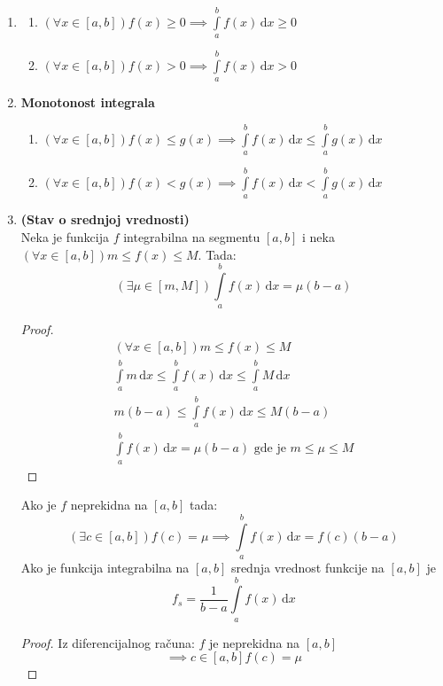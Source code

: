 \begin{enumerate}[label=\textbf{\arabic*.)}]
\begin{proof}
			$$\implies \int \limits^b_a f(x) \, \mathrm{d}x = \int \limits^b_a f_1(x) \, \mathrm{d}x$$
		\end{proof}
	\item
		\begin{theorem}
			\begin{enumerate}[label = \arabic*)]
				\item
					$(\forall x \in [a,b])f(x)\geq 0 \implies \int \limits^b_a f(x) \, \mathrm{d}x \geq 0$
				\item
					$(\forall x \in [a,b])f(x)> 0 \implies \int \limits^b_a f(x) \, \mathrm{d}x > 0$	
			\end{enumerate}
		\end{theorem}
	\item
		\textbf{Monotonost integrala}
		\begin{enumerate}[label = \arabic*)]
				\item
					$(\forall x \in [a,b])f(x)\leq g(x) \implies \int \limits^b_a f(x) \, \mathrm{d}x \leq \int \limits^b_a g(x) \, \mathrm{d}x$
				\item
					$(\forall x \in [a,b])f(x)< g(x) \implies \int \limits^b_a f(x) \, \mathrm{d}x < \int \limits^b_a g(x) \, \mathrm{d}x$	
		\end{enumerate}
		\item
			\begin{theorem}
				\textbf{(Stav o srednjoj vrednosti)}\\
				Neka je funkcija $f$ integrabilna na segmentu $[a,b]$ i neka $(\forall x \in [a,b]) m \leq f(x) \leq M$. Tada:
				$$(\exists \mu \in [m,M]) \int \limits^b_a f(x) \, \mathrm{d}x = \mu (b-a)$$
			\end{theorem}
			\begin{proof}
				\begin{gather*}
					(\forall x \in [a,b]) m \leq f(x) \leq M\\
					\int \limits^b_a m \, \mathrm{d}x \leq \int \limits^b_a f(x) \, \mathrm{d}x \leq \int \limits^b_a M \, \mathrm{d}x \\
					m(b-a)\leq\int \limits^b_a f(x) \, \mathrm{d}x\leq 	M(b-a)\\
					\int \limits^b_a f(x) \, \mathrm{d}x = \mu (b-a) \text{ gde je } m\leq\mu \leq M
				\end{gather*}
			\end{proof}
			\begin{corollary}
				Ako je $f$ neprekidna na $[a,b]$ tada:
				$$(\exists c \in [a,b])f(c) = \mu \implies \int \limits^b_a f(x) \, \mathrm{d}x = f(c)(b-a)$$
				Ako je funkcija integrabilna na $[a,b]$ srednja vrednost funkcije na $[a,b]$ je 
				$$f_s = \frac{1}{b-a}\int \limits^b_a f(x) \, \mathrm{d}x$$
			\end{corollary}
			\begin{proof}
				Iz diferencijalnog računa: $f$ je neprekidna na $[a,b]$
				$$\implies c \in [a,b] f(c) = \mu$$
			\end{proof}
\end{enumerate}


